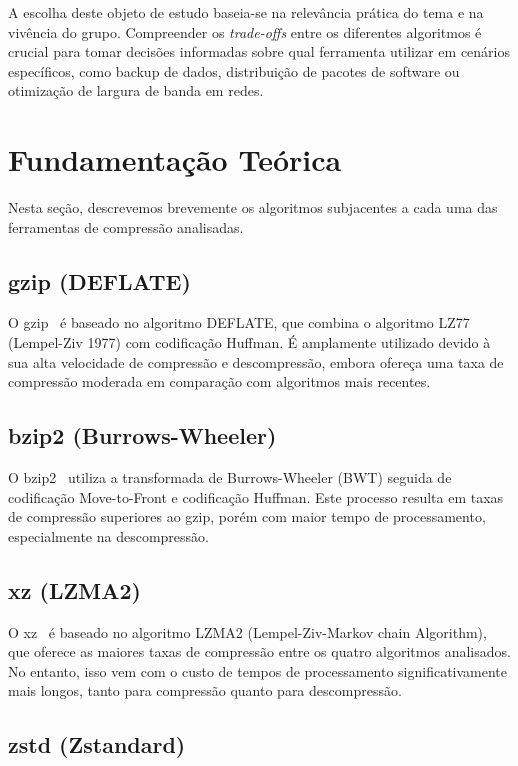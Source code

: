 \documentclass[acmsmall]{acmart}
\begin{document}
A escolha deste objeto de estudo baseia-se na relevância prática do tema e na vivência do grupo. Compreender os \textit{trade-offs} entre os diferentes algoritmos é crucial para tomar decisões informadas sobre qual ferramenta utilizar em cenários específicos, como backup de dados, distribuição de pacotes de software ou otimização de largura de banda em redes.

\section{Fundamentação Teórica}

Nesta seção, descrevemos brevemente os algoritmos subjacentes a cada uma das ferramentas de compressão analisadas.

\subsection{gzip (DEFLATE)}

O gzip~\cite{gzip} é baseado no algoritmo DEFLATE, que combina o algoritmo LZ77 (Lempel-Ziv 1977) com codificação Huffman. É amplamente utilizado devido à sua alta velocidade de compressão e descompressão, embora ofereça uma taxa de compressão moderada em comparação com algoritmos mais recentes.

\subsection{bzip2 (Burrows-Wheeler)}

O bzip2~\cite{bzip2} utiliza a transformada de Burrows-Wheeler (BWT) seguida de codificação Move-to-Front e codificação Huffman. Este processo resulta em taxas de compressão superiores ao gzip, porém com maior tempo de processamento, especialmente na descompressão.

\subsection{xz (LZMA2)}

O xz~\cite{xz} é baseado no algoritmo LZMA2 (Lempel-Ziv-Markov chain Algorithm), que oferece as maiores taxas de compressão entre os quatro algoritmos analisados. No entanto, isso vem com o custo de tempos de processamento significativamente mais longos, tanto para compressão quanto para descompressão.

\subsection{zstd (Zstandard)}
\end{document}
